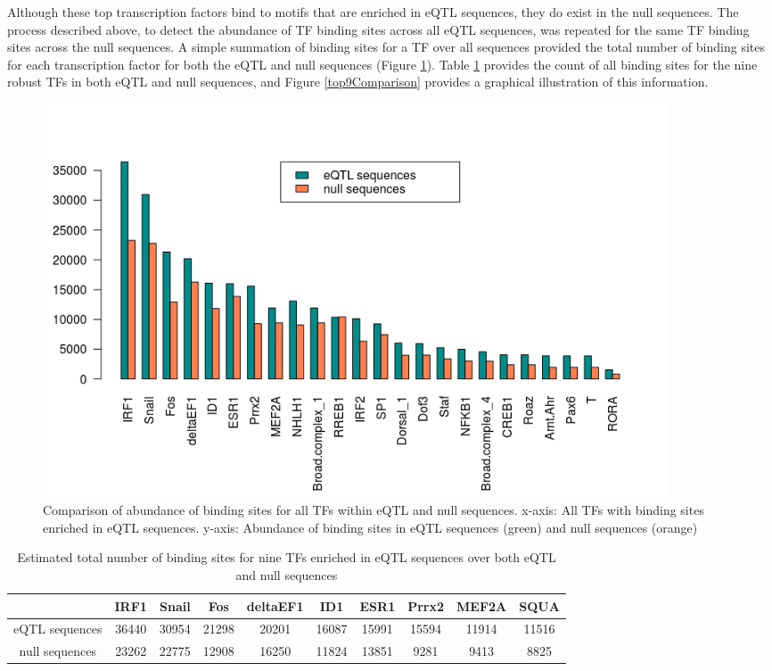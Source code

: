 \documentclass[12pt]{article}
\begin{document}
Although these top transcription factors bind to motifs that are enriched in eQTL sequences, they do exist in the null sequences. The process described above, to detect the abundance of TF binding sites across all eQTL sequences, was repeated for the same TF binding sites across the null sequences. A simple summation of binding sites for a TF over all sequences provided the total number of binding sites for each transcription factor for both the eQTL and null sequences (Figure \ref{allMotifComparison}). Table \ref{TFnosEqtl} provides the count of all binding sites for the nine robust TFs in both eQTL and null sequences, and Figure \ref{top9Comparison} provides a graphical illustration of this information.


\begin{figure}[!htbp]
\centering
\includegraphics[width= 0.9\textwidth]{AllMotifComparison.png} 
\caption{Comparison of abundance of binding sites for all TFs within eQTL and null sequences. x-axis: All TFs with binding sites enriched in eQTL sequences. y-axis: Abundance of binding sites in eQTL sequences (green) and null sequences (orange)} 
\label{allMotifComparison}
\end{figure}

\begin{table}[!htbp]
\caption{Estimated total number of binding sites for nine TFs enriched in eQTL sequences over both eQTL and null sequences}
\label{TFnosEqtl}
\centering
\begin{tabular}{cccccccccc}
\toprule[0.2em]
& IRF1 & Snail & Fos & deltaEF1 & ID1 & ESR1 & Prrx2 & MEF2A & SQUA\\
\midrule[0.1em]
 eQTL sequences & 36440 & 30954 & 21298 & 20201 & 16087 & 15991 & 15594 & 11914 & 11516\\
 null sequences & 23262 & 22775 & 12908 & 16250 & 11824 & 13851 & 9281 & 9413 & 8825\\
 \bottomrule[0.2em]
\end{tabular}
\end{table}
 
\end{document}
